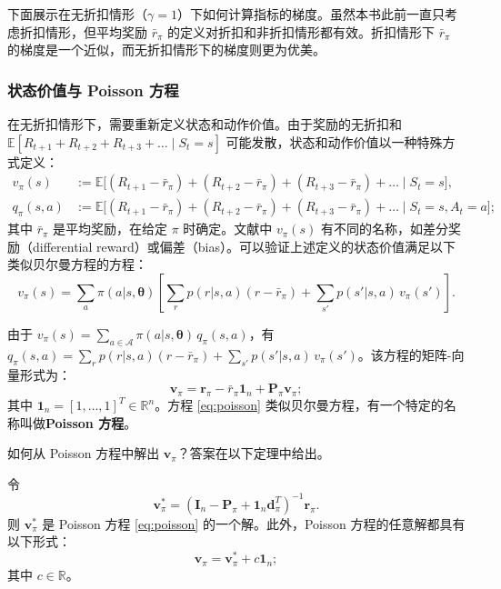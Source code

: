 \documentclass[UTF8]{article}
\begin{document}
下面展示在无折扣情形（$\gamma = 1$）下如何计算指标的梯度。虽然本书此前一直只考虑折扣情形，但平均奖励 $\bar{r}_\pi$ 的定义对折扣和非折扣情形都有效。折扣情形下 $\bar{r}_\pi$ 的梯度是一个近似，而无折扣情形下的梯度则更为优美。

\subsubsection*{状态价值与 Poisson 方程}

在无折扣情形下，需要重新定义状态和动作价值。由于奖励的无折扣和 $\mathbb{E}[R_{t+1} + R_{t+2} + R_{t+3} + \dots \mid S_t = s]$ 可能发散，状态和动作价值以一种特殊方式定义：
\begin{align*}
v_\pi(s) &:= \mathbb{E}\bigl[ (R_{t+1} - \bar{r}_\pi) + (R_{t+2} - \bar{r}_\pi) + (R_{t+3} - \bar{r}_\pi) + \dots \mid S_t = s \bigr], \\
q_\pi(s,a) &:= \mathbb{E}\bigl[ (R_{t+1} - \bar{r}_\pi) + (R_{t+2} - \bar{r}_\pi) + (R_{t+3} - \bar{r}_\pi) + \dots \mid S_t = s, A_t = a \bigr];
\end{align*}
其中 $\bar{r}_\pi$ 是平均奖励，在给定 $\pi$ 时确定。文献中 $v_\pi(s)$ 有不同的名称，如差分奖励（differential reward）或偏差（bias）。可以验证上述定义的状态价值满足以下类似贝尔曼方程的方程：
\[
v_\pi(s) = \sum_{a} \pi(a|s, \boldsymbol{\theta}) \left[ \sum_{r} p(r|s,a) (r - \bar{r}_\pi) + \sum_{s'} p(s'|s,a) \, v_\pi(s') \right].
\]

由于 $v_\pi(s) = \sum_{a \in \mathcal{A}} \pi(a|s, \boldsymbol{\theta}) \, q_\pi(s,a)$，有
$q_\pi(s,a) = \sum_{r} p(r|s,a) (r - \bar{r}_\pi) + \sum_{s'} p(s'|s,a) \, v_\pi(s')$。该方程的矩阵-向量形式为：
\begin{equation}
\boldsymbol{v}_\pi = \boldsymbol{r}_\pi - \bar{r}_\pi \boldsymbol{1}_n + \boldsymbol{P}_\pi \boldsymbol{v}_\pi; \label{eq:poisson}
\end{equation}
其中 $\boldsymbol{1}_n = [1, \dots, 1]^T \in \mathbb{R}^n$。方程 \eqref{eq:poisson} 类似贝尔曼方程，有一个特定的名称叫做\textbf{Poisson 方程}。

如何从 Poisson 方程中解出 $\boldsymbol{v}_\pi$？答案在以下定理中给出。

\begin{theorembox}
    令
    \[
    \boldsymbol{v}_\pi^* = (\boldsymbol{I}_n - \boldsymbol{P}_\pi + \boldsymbol{1}_n \boldsymbol{d}_\pi^T)^{-1} \boldsymbol{r}_\pi.
    \]
    则 $\boldsymbol{v}_\pi^*$ 是 Poisson 方程 \eqref{eq:poisson} 的一个解。此外，Poisson 方程的任意解都具有以下形式：
    \[
    \boldsymbol{v}_\pi = \boldsymbol{v}_\pi^* + c \boldsymbol{1}_n;
    \]
    其中 $c \in \mathbb{R}$。
\end{theorembox}
\end{document}
